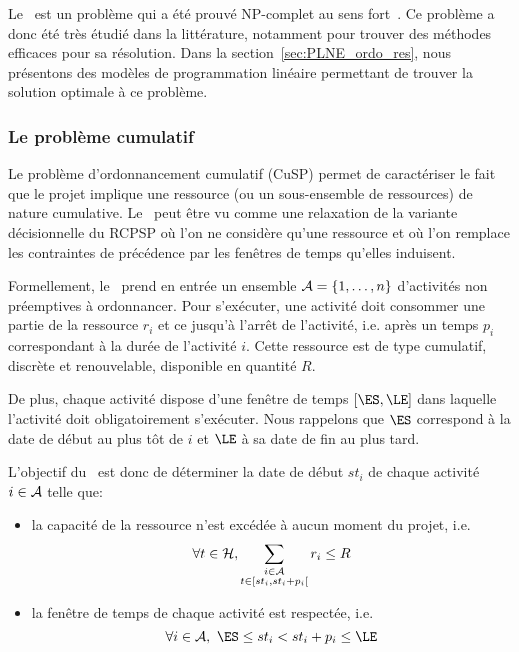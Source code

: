Le \RCPSP~est un problème qui a été prouvé NP-complet au sens
fort~\cite{NP_RCPSP}. Ce problème a donc été très étudié dans la
littérature, notamment pour trouver des méthodes efficaces pour sa
résolution. Dans la section~\ref{sec:PLNE_ordo_res}, nous présentons des
modèles de programmation linéaire permettant de trouver la solution
optimale à ce problème. 

\subsubsection{Le problème cumulatif}

Le problème d'ordonnancement cumulatif (CuSP) permet de caractériser
le fait que le projet implique une ressource (ou un sous-ensemble de
ressources) de nature cumulative. Le \CUSP~peut être vu comme une
relaxation de la variante décisionnelle du RCPSP où l'on ne considère
qu'une ressource et où l'on remplace les contraintes de précédence par
les fenêtres de temps qu'elles induisent.

Formellement, le \CUSP~prend en entrée un ensemble $ {\cal A}=\{1,\dots,n\}$
d'activités non préemptives à ordonnancer. Pour s'exécuter, une
activité doit consommer une partie de la ressource $r_i$ et ce jusqu'à
l'arrêt de l'activité, i.e. après un temps $p_i$ correspondant à la
durée de l'activité $i$. Cette ressource est de type cumulatif,
discrète et renouvelable, disponible en quantité $R$.

De plus, chaque activité dispose d'une fenêtre de temps $[\ES,\LE]$
dans laquelle l'activité doit obligatoirement s'exécuter. Nous
rappelons que $\ES$ correspond à la date de début au plus tôt de $i$
et $\LE$ à sa date de fin au plus tard.

L'objectif du \CUSP~est donc de déterminer la date de début $st_i$ de
chaque activité $i \in {\cal A}$ telle que:
\begin{itemize}
\item la capacité de la ressource n'est excédée à aucun moment du
  projet, i.e.
  \begin{equation} \forall t \in {\cal H},\sum_{\substack{i\in {\cal A}\\ t \in
        [st_i,st_i+p_i[}} r_{i} \le  R
\label{eq:CUSP_res}
\end{equation}
\item la fenêtre de temps de chaque activité est respectée, i.e. 
  \begin{equation} \forall i \in \A,\ \ES \le st_i < st_i+p_i \le \LE \end{equation}
\end{itemize}


